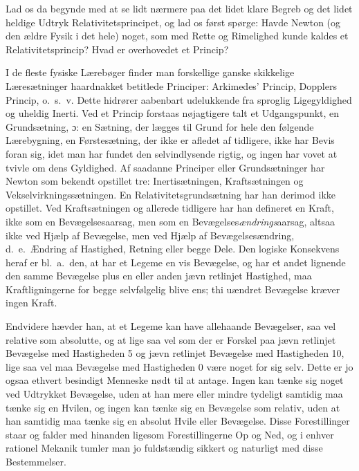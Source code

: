 \documentclass[12pt,a4paper]{article}
\newcommand{\opage}[1]{\marginnote{\footnotesize\textit{[#1]}}}
\begin{document}
\opage{195} Lad os da begynde med at se lidt nærmere paa det lidet klare Begreb og det
lidet heldige Udtryk \guillemotright Relativitetsprincipet\guillemotleft, og
lad os først spørge: Havde Newton (og den ældre Fysik i det hele) noget, som
med Rette og Rimelighed kunde kaldes et Relativitetsprincip? Hvad er
overhovedet et Princip?

I de fleste fysiske Lærebøger finder man forskellige ganske skikkelige
Læresætninger haardnakket betitlede Principer: \guillemotright Arkimedes'
Princip\guillemotleft, \guillemotright Dopplers Princip\guillemotleft,
o.\ s.\ v. Dette hidrører aabenbart udelukkende fra sproglig Ligegyldighed og
uheldig Inerti. Ved et Princip forstaas nøjagtigere talt et Udgangspunkt, en
Grundsætning, ɔ: en Sætning, der lægges til Grund for hele den følgende
Lærebygning, en Førstesætning, der ikke er afledet af tidligere, ikke har Bevis
foran sig, idet man har fundet den selvindlysende rigtig, og ingen har vovet at
tvivle om dens Gyldighed. Af saadanne Principer eller Grundsætninger har Newton
som bekendt opstillet tre: Inertisætningen, Kraftsætningen og
Vekselvirkningssætningen. En \guillemotright
Relativitetsgrundsætning\guillemotleft{} har han derimod ikke opstillet. Ved
Kraftsætningen og allerede tidligere har han defineret en Kraft, ikke som en
Bevægelsesaarsag, men som en Bevægelses\emph{ændrings}aarsag, altsaa ikke ved
Hjælp af Bevægelse, men ved Hjælp af Bevægelsesændring, d.\ e.\ Ændring af
Hastighed, Retning eller begge Dele. Den logiske Konsekvens heraf er
bl.\ a.\ den, at har et Legeme en vis Bevægelse, og har et andet lignende den
samme Bevægelse plus en eller anden jævn retlinjet Hastighed, maa
Kraftligningerne for begge selvfølgelig blive ens; thi uændret Bevægelse kræver
ingen Kraft.

Endvidere hævder han, at et Legeme kan have allehaande Bevægelser, saa vel
relative som absolutte, og at lige saa vel som der er Forskel paa jævn
retlinjet Bevægelse med Hastigheden 5 og jævn retlinjet Bevægelse med
Hastigheden 10, lige saa vel maa \guillemotright Bevægelse med Hastigheden
0\guillemotleft{} være noget for sig selv. Dette er jo ogsaa ethvert besindigt
Menneske nødt til at antage. Ingen kan tænke sig noget ved Udtrykket Bevægelse,
uden at han mere eller mindre tydeligt samtidig maa tænke sig en Hvilen, og
ingen kan tænke sig en Bevægelse som relativ, uden at han samtidig maa tænke
sig en absolut Hvile eller Bevægelse. Disse Forestillinger staar og falder med
hinanden ligesom Forestillingerne Op og Ned, og i enhver rationel Mekanik
tumler man jo fuldstændig sikkert og naturligt med disse Bestemmelser.
\end{document}
